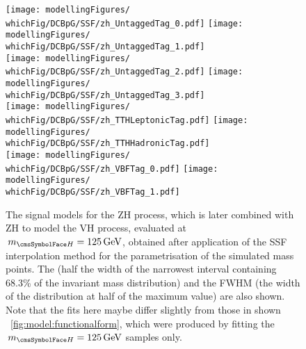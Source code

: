 \begin{figure}[htp!]
\centering
\texttt{[image: modellingFigures/\\whichFig/DCBpG/SSF/zh\_UntaggedTag\_0.pdf]} 
\texttt{[image: modellingFigures/\\whichFig/DCBpG/SSF/zh\_UntaggedTag\_1.pdf]} \\
\texttt{[image: modellingFigures/\\whichFig/DCBpG/SSF/zh\_UntaggedTag\_2.pdf]} 
\texttt{[image: modellingFigures/\\whichFig/DCBpG/SSF/zh\_UntaggedTag\_3.pdf]} \\ 
\texttt{[image: modellingFigures/\\whichFig/DCBpG/SSF/zh\_TTHLeptonicTag.pdf]} 
\texttt{[image: modellingFigures/\\whichFig/DCBpG/SSF/zh\_TTHHadronicTag.pdf]} \\ 
\texttt{[image: modellingFigures/\\whichFig/DCBpG/SSF/zh\_VBFTag\_0.pdf]} 
\texttt{[image: modellingFigures/\\whichFig/DCBpG/SSF/zh\_VBFTag\_1.pdf]} \\

\caption{The signal models for the ZH process, which is later combined with ZH to model the VH process, evaluated at $\mH=125\GeV$, obtained after application of the SSF interpolation method for the \DCBpG parametrisation of the simulated mass points. The \effSigma (half the width of the narrowest interval containing 68.3\% of the invariant mass distribution) and the FWHM (the width of the distribution at half of the maximum value) are also shown. Note that the fits here maybe differ slightly from those in shown \Fig~\ref{fig:model:functionalform}, which were produced by fitting the $\mH=125\GeV$ samples only.}

\label{fig:model:sig_model_per_zh}
\end{figure}



